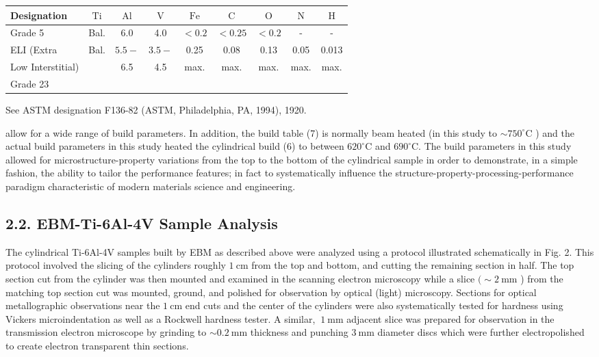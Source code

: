 \documentclass[10pt]{article}
\begin{document}
\begin{center}
\begin{tabular}{lcccccccc}
Designation & $\mathrm{Ti}$ & $\mathrm{Al}$ & $\mathrm{V}$ & $\mathrm{Fe}$ & $\mathrm{C}$ & $\mathrm{O}$ & $\mathrm{N}$ & $\mathrm{H}$ \\
\hline
Grade 5 & Bal. & 6.0 & 4.0 & $<0.2$ & $<0.25$ & $<0.2$ & - & - \\
ELI (Extra & Bal. & $5.5-$ & $3.5-$ & 0.25 & 0.08 & 0.13 & 0.05 & 0.013 \\
Low Interstitial) &  & 6.5 & 4.5 & max. & max. & max. & max. & max. \\
Grade 23 &  &  &  &  &  &  &  &  \\
\end{tabular}
\end{center}

See ASTM designation F136-82 (ASTM, Philadelphia, PA, 1994), 1920.

allow for a wide range of build parameters. In addition, the build table (7) is normally beam heated (in this study to $\sim 750^{\circ} \mathrm{C}$ ) and the actual build parameters in this study heated the cylindrical build (6) to between $620^{\circ} \mathrm{C}$ and $690^{\circ} \mathrm{C}$. The build parameters in this study allowed for microstructure-property variations from the top to the bottom of the cylindrical sample in order to demonstrate, in a simple fashion, the ability to tailor the performance features; in fact to systematically influence the structure-property-processing-performance paradigm characteristic of modern materials science and engineering.

\subsection*{2.2. EBM-Ti-6Al-4V Sample Analysis}
The cylindrical Ti-6Al-4V samples built by EBM as described above were analyzed using a protocol illustrated schematically in Fig. 2. This protocol involved the slicing of the cylinders roughly $1 \mathrm{~cm}$ from the top and bottom, and cutting the remaining section in half. The top section cut from the cylinder was then mounted and examined in the scanning electron microscopy while a slice $(\sim 2 \mathrm{~mm}$ ) from the matching top section cut was mounted, ground, and polished for observation by optical (light) microscopy. Sections for optical metallographic observations near the $1 \mathrm{~cm}$ end cuts and the center of the cylinders were also systematically tested for hardness using Vickers microindentation as well as a Rockwell hardness tester. A similar, $~ 1 \mathrm{~mm}$ adjacent slice was prepared for observation in the transmission electron microscope by grinding to $\sim 0.2 \mathrm{~mm}$ thickness and punching $3 \mathrm{~mm}$ diameter discs which were further electropolished to create electron transparent thin sections.
\end{document}
